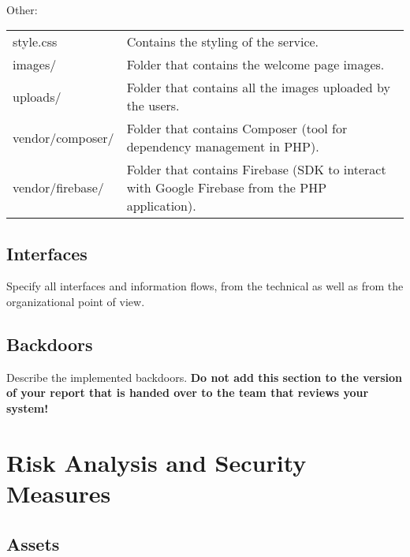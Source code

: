 \documentclass{article}
\begin{document}
\ \\
\newline
Other: \\
{
\begin{tabular}{ |p{3cm}|p{9cm}| }
\hline
style.css & Contains the styling of the service. \\
images/ & Folder that contains the welcome page images. \\
uploads/ & Folder that contains all the images uploaded by the users. \\
vendor/composer/ & Folder that contains Composer (tool for dependency management in PHP). \\
vendor/firebase/ & Folder that contains Firebase (SDK to interact with Google Firebase from the PHP application). \\
\hline
\end{tabular}
}

\subsection{Interfaces}

Specify  all interfaces and  information flows, from the technical as well as from the
  organizational point of view.

\subsection{Backdoors}

Describe the implemented backdoors. {\bfseries Do not add
    this section to the version of your report that is handed over to
    the team that reviews your system!}


\section{Risk Analysis and Security Measures}

\subsection{Assets}
\end{document}
